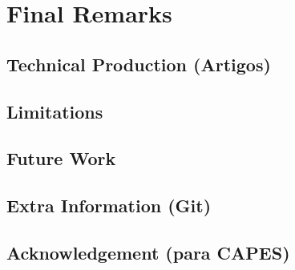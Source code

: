 \chapter{Final Remarks}

\section{Technical Production (Artigos)}

\section{Limitations}

\section{Future Work}


\section{Extra Information (Git)}

\section{Acknowledgement (para CAPES)}
